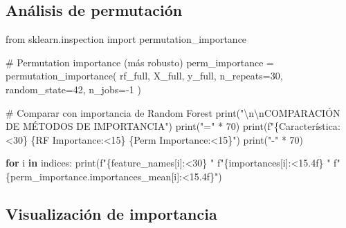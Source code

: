 \documentclass[
  doc,
  floatsintext,
  longtable,
  a4paper,
  nolmodern,
  notxfonts,
  notimes,
  12pt,
  colorlinks=true,linkcolor=blue,citecolor=blue,urlcolor=blue]{apa7}
\newenvironment{Shaded}{\begin{snugshade}}{\end{snugshade}}
\newcommand{\BuiltInTok}[1]{\textcolor[rgb]{0.00,0.23,0.31}{#1}}
\newcommand{\CharTok}[1]{\textcolor[rgb]{0.13,0.47,0.30}{#1}}
\newcommand{\CommentTok}[1]{\textcolor[rgb]{0.37,0.37,0.37}{#1}}
\newcommand{\ControlFlowTok}[1]{\textcolor[rgb]{0.00,0.23,0.31}{\textbf{#1}}}
\newcommand{\DecValTok}[1]{\textcolor[rgb]{0.68,0.00,0.00}{#1}}
\newcommand{\ImportTok}[1]{\textcolor[rgb]{0.00,0.46,0.62}{#1}}
\newcommand{\KeywordTok}[1]{\textcolor[rgb]{0.00,0.23,0.31}{\textbf{#1}}}
\newcommand{\NormalTok}[1]{\textcolor[rgb]{0.00,0.23,0.31}{#1}}
\newcommand{\OperatorTok}[1]{\textcolor[rgb]{0.37,0.37,0.37}{#1}}
\newcommand{\SpecialCharTok}[1]{\textcolor[rgb]{0.37,0.37,0.37}{#1}}
\newcommand{\SpecialStringTok}[1]{\textcolor[rgb]{0.13,0.47,0.30}{#1}}
\newcommand{\StringTok}[1]{\textcolor[rgb]{0.13,0.47,0.30}{#1}}
\begin{document}
\subsection{Análisis de
permutación}\label{anuxe1lisis-de-permutaciuxf3n}

\begin{Shaded}
\begin{Highlighting}[]
\ImportTok{from}\NormalTok{ sklearn.inspection }\ImportTok{import}\NormalTok{ permutation\_importance}

\CommentTok{\# Permutation importance (más robusto)}
\NormalTok{perm\_importance }\OperatorTok{=}\NormalTok{ permutation\_importance(}
\NormalTok{    rf\_full, X\_full, y\_full,}
\NormalTok{    n\_repeats}\OperatorTok{=}\DecValTok{30}\NormalTok{,}
\NormalTok{    random\_state}\OperatorTok{=}\DecValTok{42}\NormalTok{,}
\NormalTok{    n\_jobs}\OperatorTok{={-}}\DecValTok{1}
\NormalTok{)}

\CommentTok{\# Comparar con importancia de Random Forest}
\BuiltInTok{print}\NormalTok{(}\StringTok{"}\CharTok{\textbackslash{}n\textbackslash{}n}\StringTok{COMPARACIÓN DE MÉTODOS DE IMPORTANCIA"}\NormalTok{)}
\BuiltInTok{print}\NormalTok{(}\StringTok{"="} \OperatorTok{*} \DecValTok{70}\NormalTok{)}
\BuiltInTok{print}\NormalTok{(}\SpecialStringTok{f"}\SpecialCharTok{\{}\StringTok{\textquotesingle{}Característica\textquotesingle{}}\SpecialCharTok{:\textless{}30\}}\SpecialStringTok{ }\SpecialCharTok{\{}\StringTok{\textquotesingle{}RF Importance\textquotesingle{}}\SpecialCharTok{:\textless{}15\}}\SpecialStringTok{ }\SpecialCharTok{\{}\StringTok{\textquotesingle{}Perm Importance\textquotesingle{}}\SpecialCharTok{:\textless{}15\}}\SpecialStringTok{"}\NormalTok{)}
\BuiltInTok{print}\NormalTok{(}\StringTok{"{-}"} \OperatorTok{*} \DecValTok{70}\NormalTok{)}

\ControlFlowTok{for}\NormalTok{ i }\KeywordTok{in}\NormalTok{ indices:}
    \BuiltInTok{print}\NormalTok{(}\SpecialStringTok{f"}\SpecialCharTok{\{}\NormalTok{feature\_names[i]}\SpecialCharTok{:\textless{}30\}}\SpecialStringTok{ "}
          \SpecialStringTok{f"}\SpecialCharTok{\{}\NormalTok{importances[i]}\SpecialCharTok{:\textless{}15.4f\}}\SpecialStringTok{ "}
          \SpecialStringTok{f"}\SpecialCharTok{\{}\NormalTok{perm\_importance}\SpecialCharTok{.}\NormalTok{importances\_mean[i]}\SpecialCharTok{:\textless{}15.4f\}}\SpecialStringTok{"}\NormalTok{)}
\end{Highlighting}
\end{Shaded}

\subsection{Visualización de
importancia}\label{visualizaciuxf3n-de-importancia}
\end{document}
